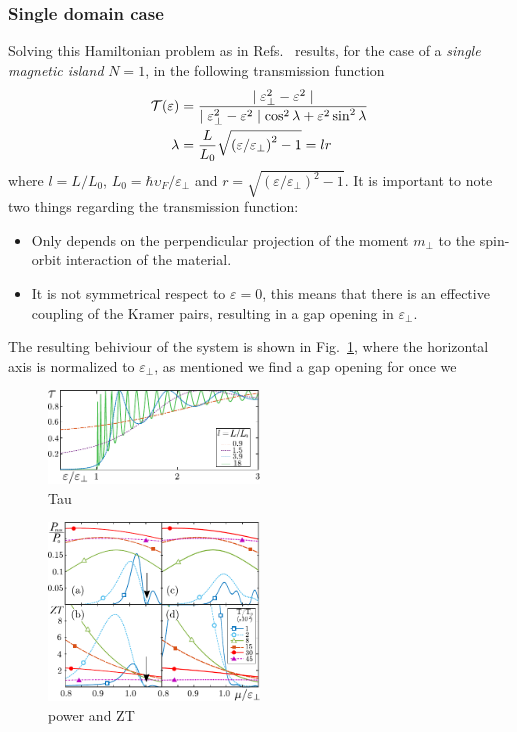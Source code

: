 \subsubsection{Single domain case}
Solving this Hamiltonian problem as in Refs.~\cite{BustosMarun2013,Gresta2019,Gresta2021PhD} results, for the case of a \textit{single magnetic island} $N=1$, in the following transmission function 
\begin{align}
    \label{eq:teo:transFuncQSH}
    \mathcal{T}(\varepsilon) &= \frac{\mid \varepsilon^2_\perp - \varepsilon^2 \mid}{\mid \varepsilon^2_\perp - \varepsilon^2 \mid \cos^2{\lambda} + \varepsilon^2 \sin^2{\lambda}}\\
    \lambda &= \frac{L}{L_0}\sqrt{\left( \varepsilon/\varepsilon_{\perp} \right)^2-1} = lr 
\end{align}
where $l = L/L_0$, $L_0 = \hbar \upsilon_F/\varepsilon_{\perp}$ and  $r=\sqrt{\left( \varepsilon/\varepsilon_{\perp} \right)^2-1}$. It is important to note two things regarding the transmission function:
\begin{itemize}
    \item Only depends on the perpendicular projection of the moment $m_{\perp}$ to the spin-orbit interaction of the material. 
    \item It is not symmetrical respect to $\varepsilon =0$, this means that there is an effective coupling of the Kramer pairs, resulting in a gap opening in $\varepsilon_{\perp}$.
\end{itemize}

The resulting behiviour of the system is shown in Fig.~\ref{fig:teo:tau1isla}, where the horizontal axis is normalized to $\varepsilon_{\perp}$, as mentioned we find a gap opening for once we 





\begin{figure}
    \centering
    \includegraphics[width = 0.5\textwidth]{figures/theory/fig2.pdf}
    \caption{Tau}
    \label{fig:teo:tau1isla}
\end{figure}

\begin{figure}
    \centering
    \includegraphics[width = 0.5\textwidth]{figures/theory/fig3.pdf}
    \caption{power and ZT}
    \label{fig:teo:powerZT}
\end{figure}

